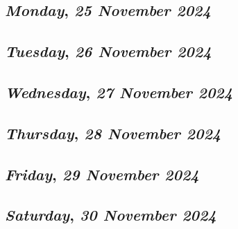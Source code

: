 \def\day{\textit{25 November 2024}}
\def\weekday{\textit{Monday}}
\subsection*{\weekday, \day}

\def\day{\textit{26 November 2024}}
\def\weekday{\textit{Tuesday}}
\subsection*{\weekday, \day}

\def\day{\textit{27 November 2024}}
\def\weekday{\textit{Wednesday}}
\subsection*{\weekday, \day}

\def\day{\textit{28 November 2024}}
\def\weekday{\textit{Thursday}}
\subsection*{\weekday, \day}

\def\day{\textit{29 November 2024}}
\def\weekday{\textit{Friday}}
\subsection*{\weekday, \day}

\def\day{\textit{30 November 2024}}
\def\weekday{\textit{Saturday}}
\subsection*{\weekday, \day}
